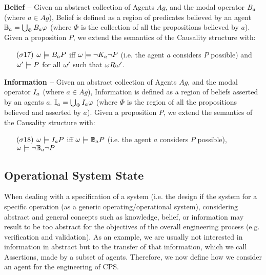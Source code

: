 \begin{definition}{\bf Belief --}\label{def:belief}
	Given an abstract collection of Agents $Ag$, and the modal operator
	$B_{a}$ (where $a\in Ag$), Belief is defined as a region 
	of predicates believed by an agent $\mathbb{B}_{a}=\bigcup_\Phi B_{a}\varphi$
	(where $\Phi$ is the collection of all the propositions believed by $a$).
	Given a proposition $P$, we extend the semantics of the Causality structure with:
	\begin{enumerate}[noitemsep]
		\item[$(\sigma17)$] $\omega\models B_{a}P$ iff
			$\omega\models\neg K_{a}\neg P$ (i.e. the agent $a$ considers $P$ possible) 
			and $\omega'\models P$ for all
			$\omega'$ such that $\omega R\omega'$.
	\end{enumerate}
\end{definition}

\begin{definition}{\bf Information --}\label{def:information}
	Given an abstract collection of Agents $Ag$, and the modal operator
	$I_{a}$ (where $a\in Ag$), Information is defined as a region 
	of beliefs asserted by an agents $a$.
	$\mathbb{I}_{a}=\bigcup_\Phi I_{a}{\varphi}$
	(where $\Phi$ is the region of all the propositions believed and asserted by $a$).
	Given a proposition $P$, we extend the semantics of the Causality structure with:
	\begin{enumerate}[noitemsep]
		\item[$(\sigma18)$] $\omega\models I_{a}P$ iff
			$\omega\models\mathbb{B}_{a}{P}$ (i.e. the agent $a$ considers $P$ possible), 
			$\omega\models\neg\mathbb{B}_{a}{\neg P}$%
	\end{enumerate}
\end{definition}

\subsection{Operational System State}\label{sec:engsystemstate}
When dealing with a specification of a system (i.e. the design if the system
for a specific operation (as a generic operating/operational system),
considering abstract and general concepts such as knowledge, belief, or
information may result to be too abstract for the objectives of the overall engineering
process (e.g. verification and validation).
As an example, we are usually not
interested in information in abstract but to the transfer of that
information, which we call Assertions, made by a subset of agents. 
Therefore, we now define how we consider an agent for the engineering
of CPS.

